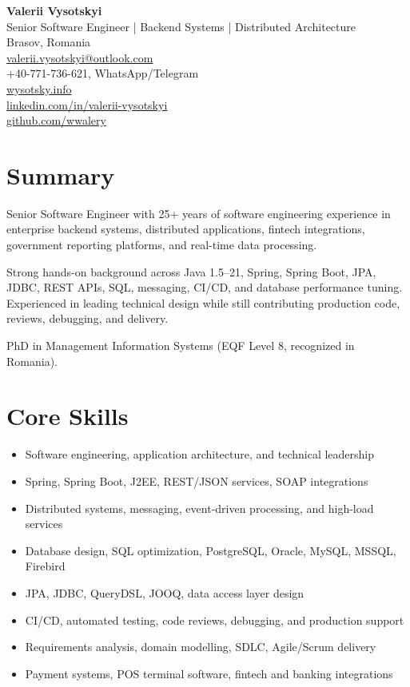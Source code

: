 \documentclass[10pt,a4paper]{article}
\begin{document}
{\LARGE \textbf{Valerii Vysotskyi}} \\[4pt]
\textcolor{accent}{Senior Software Engineer | Backend Systems | Distributed Architecture} \\[6pt]

Brasov, Romania \\
\href{mailto:valerii.vysotskyi@outlook.com}{valerii.vysotskyi@outlook.com} \\
+40-771-736-621, WhatsApp/Telegram \\
\href{https://wysotsky.info}{wysotsky.info} \\
\href{https://linkedin.com/in/valerii-vysotskyi}{linkedin.com/in/valerii-vysotskyi} \\
\href{https://github.com/wwalery}{github.com/wwalery}

\vspace{6pt}

\section*{Summary}

Senior Software Engineer with 25+ years of software engineering experience in enterprise backend systems, distributed applications, fintech integrations, government reporting platforms, and real-time data processing.

Strong hands-on background across Java 1.5--21, Spring, Spring Boot, JPA, JDBC, REST APIs, SQL, messaging, CI/CD, and database performance tuning. Experienced in leading technical design while still contributing production code, reviews, debugging, and delivery.

PhD in Management Information Systems (EQF Level 8, recognized in Romania).

\section*{Core Skills}

\begin{itemize}
\item Software engineering, application architecture, and technical leadership
\item Spring, Spring Boot, J2EE, REST/JSON services, SOAP integrations
\item Distributed systems, messaging, event-driven processing, and high-load services
\item Database design, SQL optimization, PostgreSQL, Oracle, MySQL, MSSQL, Firebird
\item JPA, JDBC, QueryDSL, JOOQ, data access layer design
\item CI/CD, automated testing, code reviews, debugging, and production support
\item Requirements analysis, domain modelling, SDLC, Agile/Scrum delivery
\item Payment systems, POS terminal software, fintech and banking integrations
\end{itemize}
\end{document}
